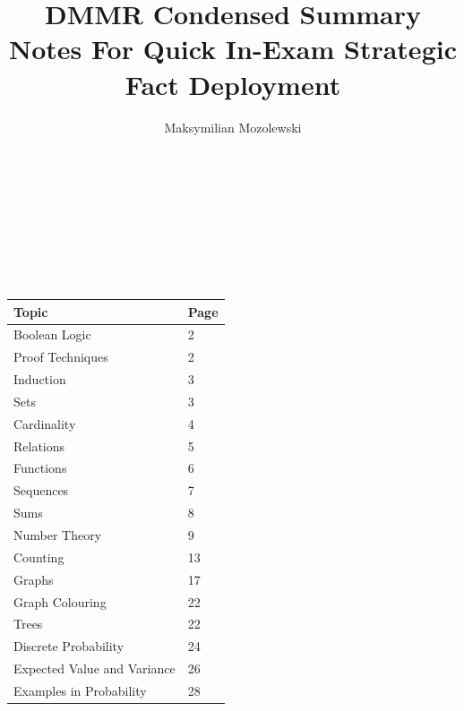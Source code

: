 \documentclass{article}
\begin{document}
\title{DMMR Condensed Summary Notes For Quick In-Exam Strategic Fact Deployment }
\author{Maksymilian Mozolewski}
\maketitle\\

\begin{center}
{\Large{\\\\\\\
\begin{tabular*}{\textwidth}{l|l}
     \textbf{Topic} & \textbf{Page} \\ \hline
     Boolean Logic & 2\\ \hline
     Proof Techniques & 2\\ \hline
     Induction & 3\\ \hline
     Sets & 3\\ \hline
     Cardinality & 4\\ \hline
     Relations & 5\\ \hline
     Functions & 6\\ \hline
     Sequences & 7\\ \hline
     Sums & 8\\ \hline
     Number Theory & 9\\ \hline
     Counting & 13\\ \hline
     Graphs & 17\\ \hline
     Graph Colouring & 22 \\ \hline
     Trees & 22\\\hline
     Discrete Probability & 24\\ \hline
     Expected Value and Variance & 26\\ \hline
     Examples in Probability & 28 \\ \hline
\end{tabular*}}}
\end{center}

\pagebreak
{}


\end{document}
